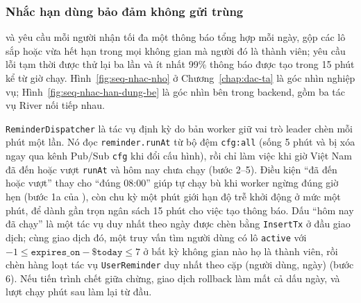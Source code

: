 \subsubsection{Nhắc hạn dùng bảo đảm không gửi trùng}\label{sssec:kt-nhac-han}

 và  yêu cầu mỗi người nhận tối đa một thông báo tổng hợp mỗi ngày, gộp các lô sắp hoặc vừa hết hạn trong mọi không gian mà người đó là thành viên;  yêu cầu lỗi tạm thời được thử lại ba lần và ít nhất 99\% thông báo được tạo trong 15 phút kể từ giờ chạy. Hình~\ref{fig:seq-nhac-nho} ở Chương~\ref{chap:dac-ta} là góc nhìn nghiệp vụ; Hình~\ref{fig:seq-nhac-han-dung-be} là góc nhìn bên trong backend, gồm ba tác vụ River nối tiếp nhau.


\texttt{ReminderDispatcher} là tác vụ định kỳ do bản worker giữ vai trò leader chèn mỗi phút một lần. Nó đọc \texttt{reminder.runAt} từ bộ đệm \texttt{cfg:all} (sống 5 phút và bị xóa ngay qua kênh Pub/Sub \texttt{cfg} khi  đổi cấu hình), rồi chỉ làm việc khi giờ Việt Nam đã đến hoặc vượt \texttt{runAt} và hôm nay chưa chạy (bước 2--5). Điều kiện “đã đến hoặc vượt” thay cho “đúng 08:00” giúp tự chạy bù khi worker ngừng đúng giờ hẹn (bước 1a của ), còn chu kỳ một phút giới hạn độ trễ khởi động ở mức một phút, để dành gần trọn ngân sách 15 phút cho việc tạo thông báo. Dấu “hôm nay đã chạy” là một tác vụ duy nhất theo ngày được chèn bằng \texttt{InsertTx} ở đầu giao dịch; cùng giao dịch đó, một truy vấn tìm người dùng có lô \texttt{active} với $-1 \le \texttt{expires\_on} - \texttt{\$today} \le 7$ ở bất kỳ không gian nào họ là thành viên, rồi chèn hàng loạt tác vụ \texttt{UserReminder} duy nhất theo cặp (người dùng, ngày) (bước 6). Nếu tiến trình chết giữa chừng, giao dịch rollback làm mất cả dấu ngày, và lượt chạy phút sau làm lại từ đầu.

